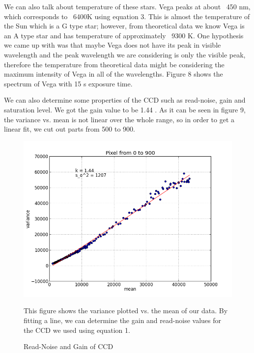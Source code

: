 \documentclass[letterpaper,12pt]{article}
\begin{document}
We can also talk about temperature of these stars. Vega peaks at about ~450 nm, which corresponds to ~6400K using equation 3. This is almost the temperature of the Sun which is a G type star; however, from theoretical data we know Vega is an A type star and has temperature of approximately ~9300 K. One hypothesis we came up with was that maybe Vega does not have its peak in visible wavelength and the peak wavelength we are considering is only the visible peak, therefore the temperature from theoretical data might be considering the maximum intensity of Vega in all of the wavelengths. Figure 8 shows the spectrum of Vega with 15 s exposure time.

We can also determine some properties of the CCD such as read-noise, gain and saturation level. We got the gain value to be 1.44 . As it can be seen in figure 9, the variance vs. mean is not linear over the whole range, so in order to get a linear fit, we cut out parts from 500 to 900.



\begin{figure}[H]
\centering
\includegraphics[scale=0.6]{noise3.png}
\caption{Read-Noise and Gain of CCD}
This figure shows the variance plotted vs. the mean of our data. By fitting  a line, we can determine the gain and read-noise values for the CCD we used using equation 1.
\end{figure}
\end{document}
